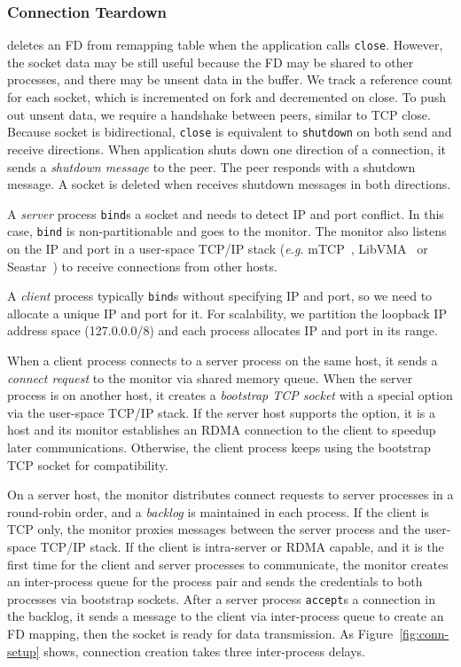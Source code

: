\subsubsection{Connection Teardown}
\quad

\libipc{} deletes an FD from remapping table when the application calls \texttt{close}.
However, the socket data may be still useful because the FD may be shared to other processes, and there may be unsent data in the buffer.
We track a reference count for each socket, which is incremented on fork and decremented on close.
To push out unsent data, we require a handshake between peers, similar to TCP close.
Because socket is bidirectional, \texttt{close} is equivalent to \texttt{shutdown} on both send and receive directions.
When application shuts down one direction of a connection, it sends a \emph{shutdown message} to the peer.
The peer responds with a shutdown message.
A socket is deleted when \libipc{} receives shutdown messages in both directions.



\iffalse

A \emph{server} process \texttt{bind}s a socket and needs to detect IP and port conflict. In this case, \texttt{bind} is non-partitionable and goes to the monitor. The monitor also listens on the IP and port in a user-space TCP/IP stack (\textit{e.g.} mTCP~\cite{jeong2014mtcp}, LibVMA~\cite{libvma} or Seastar~\cite{seastar}) to receive connections from other hosts.

A \emph{client} process typically \texttt{bind}s without specifying IP and port, so we need to allocate a unique IP and port for it. For scalability, we partition the loopback IP address space (127.0.0.0/8) and each process allocates IP and port in its range.

When a client process connects to a server process on the same host, it sends a \textit{connect request} to the monitor via shared memory queue. When the server process is on another host, it creates a \textit{bootstrap TCP socket} with a special option via the user-space TCP/IP stack. If the server host supports the option, it is a \sys host and its monitor establishes an RDMA connection to the client to speedup later communications. Otherwise, the client process keeps using the bootstrap TCP socket for compatibility.

On a server host, the monitor distributes connect requests to server processes in a round-robin order, and a \textit{backlog} is maintained in each process. If the client is TCP only, the monitor proxies messages between the server process and the user-space TCP/IP stack. If the client is intra-server or RDMA capable, and it is the first time for the client and server processes to communicate, the monitor creates an inter-process queue for the process pair and sends the credentials to both processes via bootstrap sockets. After a server process \texttt{accept}s a connection in the backlog, it sends a message to the client via inter-process queue to create an FD mapping, then the socket is ready for data transmission. As Figure~\ref{fig:conn-setup} shows, connection creation takes three inter-process delays.

